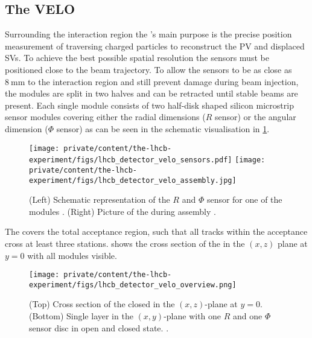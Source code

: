 \subsection{The \acl*{VELO}}
\label{sec:lhcb_experiment:tracking:velo}

Surrounding the \protonproton interaction region the \VELO's main purpose is the
precise position measurement of traversing charged particles to reconstruct the
\ac{PV} and displaced \acp{SV}. To achieve the best possible spatial resolution
the sensors must be positioned close to the beam trajectory. To allow the
sensors to be as close as $\SI{8}{\milli\metre}$ to the interaction region and
still prevent damage during beam injection, the \VELO modules are split in two
halves and can be retracted until stable beams are present. Each single module
consists of two half-disk shaped silicon microstrip sensor modules covering
either the radial dimensions ($R$ sensor) or the angular dimension
($\mathit{\Phi}$ sensor) as can be seen in the schematic visualisation in
\cref{fig:lhcb_experiment:tracking:velo:sensor}.
%
\begin{figure}[t]
  \texttt{[image: private/content/the-lhcb-experiment/figs/lhcb\_detector\_velo\_sensors.pdf]}
  \texttt{[image: private/content/the-lhcb-experiment/figs/lhcb\_detector\_velo\_assembly.jpg]}
  \caption{(Left) Schematic representation of the $R$ and $\mathit{\Phi}$ sensor
  for one of the \VELO modules \cite{Alves:2008zz}. (Right) Picture of the \VELO
  during assembly \cite{Aaij:1707015}. }
  \label{fig:lhcb_experiment:tracking:velo:sensor}
\end{figure}
%
The \VELO covers the total \LHCb acceptance region, such that all tracks within
the acceptance cross at least three \VELO stations.
 shows the cross section of the
\VELO in the $(x,z)$ plane at $y=0$ with all modules visible.
%
\begin{figure}[t]
  \texttt{[image: private/content/the-lhcb-experiment/figs/lhcb\_detector\_velo\_overview.png]}
  \caption{
    (Top) Cross section of the closed \VELO in the $(x,z)$-plane at $y=0$.
  (Bottom) Single \VELO layer in the $(x,y)$-plane with one $R$ and one
  $\mathit{\Phi}$ sensor disc in open and closed state. \cite{Alves:2008zz}.
  }
  \label{fig:lhcb_experiment:tracking:velo:overview}
\end{figure}

